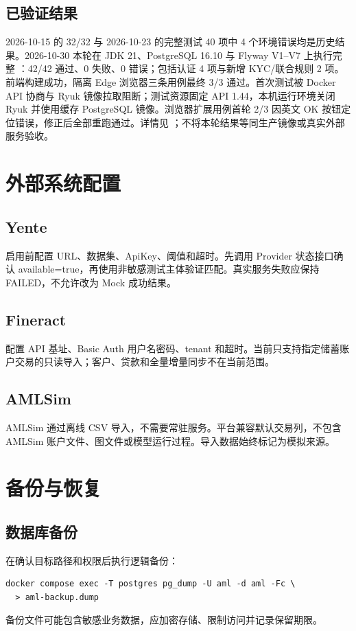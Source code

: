 \documentclass[UTF8,openany,zihao=-4]{ctexrep}
\begin{document}
\section{已验证结果}
2026-10-15 的 32/32 与 2026-10-23 的完整测试 40 项中 4 个环境错误均是历史结果。2026-10-30 本轮在 JDK 21、PostgreSQL 16.10 与 Flyway V1--V7 上执行完整 ：42/42 通过、0 失败、0 错误；包括认证 4 项与新增 KYC/联合规则 2 项。前端构建成功，隔离 Edge 浏览器三条用例最终 3/3 通过。首次测试被 Docker API 协商与 Ryuk 镜像拉取阻断；测试资源固定 API 1.44，本机运行环境关闭 Ryuk 并使用缓存 PostgreSQL 镜像。浏览器扩展用例首轮 2/3 因英文 OK 按钮定位错误，修正后全部重跑通过。详情见 ；不将本轮结果等同生产镜像或真实外部服务验收。

\chapter{外部系统配置}
\section{Yente}
启用前配置 URL、数据集、ApiKey、阈值和超时。先调用 Provider 状态接口确认 available=true，再使用非敏感测试主体验证匹配。真实服务失败应保持 FAILED，不允许改为 Mock 成功结果。

\section{Fineract}
配置 API 基址、Basic Auth 用户名密码、tenant 和超时。当前只支持指定储蓄账户交易的只读导入；客户、贷款和全量增量同步不在当前范围。

\section{AMLSim}
AMLSim 通过离线 CSV 导入，不需要常驻服务。平台兼容默认交易列，不包含 AMLSim 账户文件、图文件或模型运行过程。导入数据始终标记为模拟来源。

\chapter{备份与恢复}
\section{数据库备份}
在确认目标路径和权限后执行逻辑备份：
\begin{lstlisting}
docker compose exec -T postgres pg_dump -U aml -d aml -Fc \
  > aml-backup.dump
\end{lstlisting}
备份文件可能包含敏感业务数据，应加密存储、限制访问并记录保留期限。
\end{document}
